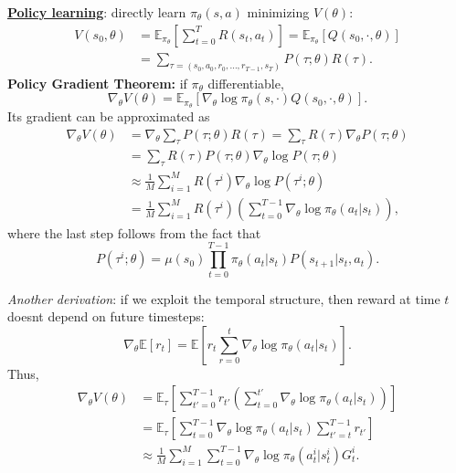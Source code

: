 \documentclass[10pt,landscape]{article}
\begin{document}
\begin{multicols}{3}
\vspace{2mm}

\underline{\textbf{Policy learning}}: directly learn $\pi_\theta(s,a)$ minimizing $V(\theta)$:
\begin{align*}
V(s_0,\theta)
&=\mathbb{E}_{\pi_\theta}\left[\sum_{t=0}^T R(s_t,a_t)\right]
=\mathbb{E}_{\pi_\theta}\left[
Q(s_0,\cdot,\theta)
\right]
\\
&=
\sum_{\tau=(s_0,a_0,r_0,\dots,r_{T-1},s_T)}P(\tau;\theta)R(\tau).
\end{align*}
\textbf{Policy Gradient Theorem:} if $\pi_\theta$ differentiable,
$$
\nabla_\theta V(\theta)=\mathbb{E}_{\pi_\theta}\left[
\nabla_\theta\log\pi_\theta(s,\cdot)Q(s_0,\cdot,\theta)
\right].
$$
Its gradient can be approximated as
\begin{align*}
\nabla_\theta V(\theta)
&=\nabla_\theta\sum_{\tau}P(\tau;\theta)R(\tau)=\sum_\tau R(\tau)\nabla_\theta P(\tau;\theta)
\\
&=\sum_\tau
R(\tau)P(\tau;\theta)
\nabla_\theta \log P(\tau;\theta)\\
&\approx \frac{1}{M}\sum_{i=1}^M
R(\tau^i)
\nabla_\theta \log P(\tau^i;\theta)
\\
&=
\frac{1}{M}\sum_{i=1}^M
R(\tau^i)
\left(
\sum_{t=0}^{T-1}\nabla_\theta \log \pi_\theta(a_t|s_t)\right),
\end{align*}
where the last step follows from the fact that
$$
P(\tau^i;\theta)
=
\mu(s_0)\prod_{t=0}^{T-1}\pi_\theta(a_t|s_t)P(s_{t+1}|s_t,a_t).
$$

\textit{Another derivation}: if we exploit the temporal structure, then reward at time $t$ doesnt depend on future timesteps: 
$$\nabla_\theta \mathbb{E}[r_t]=\mathbb{E}\left[
r_t\sum_{r=0}^t\nabla_\theta\log \pi_\theta(a_t|s_t)
\right].
$$
Thus, 
\begin{align*}
\nabla_\theta V(\theta)
%
%
&=
\mathbb{E}_\tau\left[
\sum_{t'=0}^{T-1}r_{t'}
\left(
\sum_{t=0}^{t'}\nabla_\theta \log \pi_\theta(a_t|s_t)\right)\right]
\\
&=
\mathbb{E}_\tau\left[
\sum_{t=0}^{T-1}\nabla_\theta \log \pi_\theta(a_t|s_t)
\sum_{t'=t}^{T-1}r_{t'}
\right]
\\
&\approx
\frac{1}{M}\sum_{i=1}^M\sum_{t=0}^{T-1}\nabla_\theta \log \pi_\theta(a_t^i|s_t^i)
G_{t}^i.
\end{align*}


\end{multicols}
\end{document}
